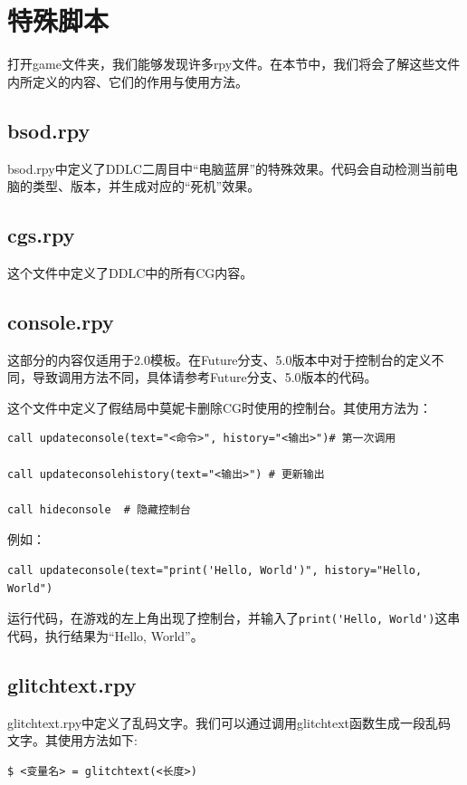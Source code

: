 \documentclass[../../Main.tex]{subfiles}
\begin{document}
\section{特殊脚本}

打开game文件夹，我们能够发现许多rpy文件。在本节中，我们将会了解这些文件内所定义的内容、它们的作用与使用方法。

\subsection{bsod.rpy}

bsod.rpy中定义了DDLC二周目中“电脑蓝屏”的特殊效果。代码会自动检测当前电脑的类型、版本，并生成对应的“死机”效果。


\subsection{cgs.rpy}

这个文件中定义了DDLC中的所有CG内容。


\subsection{console.rpy}
\begin{Attention}
    这部分的内容仅适用于2.0模板。在Future分支、5.0版本中对于控制台的定义不同，导致调用方法不同，具体请参考Future分支、5.0版本的代码。
\end{Attention}

这个文件中定义了假结局中莫妮卡删除CG时使用的控制台。其使用方法为：
\begin{lstlisting}
call updateconsole(text="<命令>", history="<输出>")# 第一次调用

call updateconsolehistory(text="<输出>") # 更新输出

call hideconsole  # 隐藏控制台
\end{lstlisting}

例如：
\begin{lstlisting}
call updateconsole(text="print('Hello, World')", history="Hello, World")
\end{lstlisting}

运行代码，在游戏的左上角出现了控制台，并输入了\verb|print('Hello, World')|这串代码，执行结果为“Hello, World”。

\subsection{glitchtext.rpy}

glitchtext.rpy中定义了乱码文字。我们可以通过调用glitchtext函数生成一段乱码文字。其使用方法如下:
\begin{lstlisting}
$ <变量名> = glitchtext(<长度>)
\end{lstlisting}
\end{document}
